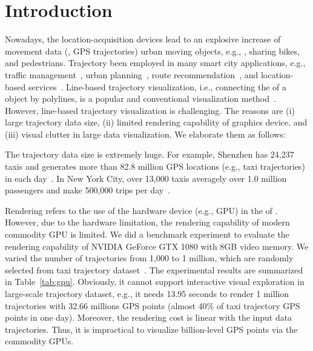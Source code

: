 \section{Introduction}\label{sec:intro}
Nowadays, the  location-acquisition devices lead to an explosive increase of movement data (, GPS trajectories)  urban moving objects, e.g., , sharing bikes, and pedestrians.
Trajectory  been employed in many smart city applications, e.g.,  traffic management~\cite{wang2014visual}, urban planning~\cite{tang2017efficient}, route recommendation~\cite{zheng2011learning}, and location-based services~\cite{liu2016smartadp, zheng2010collaborative}.
Line-based trajectory visualization, i.e., connecting the  of a  object by polylines, is a popular and conventional visualization method~\cite{chen2015survey}.
However,  line-based trajectory visualization is challenging.
The reasons are (i) large trajectory data size, (ii) limited rendering capability of graphics device, and (iii) visual clutter in large data visualization.
We elaborate them as follows:

 The trajectory data size is extremely huge.
For example, Shenzhen has 24,237 taxis and generates more than 82.8 million GPS locations (e.g., taxi trajectories) in each day~\cite{sz}. %
In New York City,  over 13,000 taxis  averagely  over 1.0 million passengers and make 500,000 trips per day~\cite{ferreira2013visual}.

Rendering refers to the use of the hardware device (e.g., GPU) in the  of .
However, due to the hardware limitation, the rendering capability of modern commodity GPU is limited.
We did a benchmark experiment to evaluate the rendering capability of NVIDIA GeForce GTX 1080 with 8GB video memory.
We varied the number of trajectories from 1,000 to 1 million, which are randomly selected from \pt{} taxi trajectory dataset~\cite{pt}.%
The experimental results are summarized in Table~\ref{tab:gpu}.
Obviously, it cannot support interactive visual exploration in large-scale trajectory dataset, e.g.,
it needs 13.95 seconds to render 1 million trajectories with 32.66 millions GPS points (almost 40\% of \sz{} taxi trajectory GPS points in one day).
Moreover, the rendering cost is linear with the input data trajectories.
Thus, it is impractical to visualize billion-level GPS points via the commodity GPUs.

